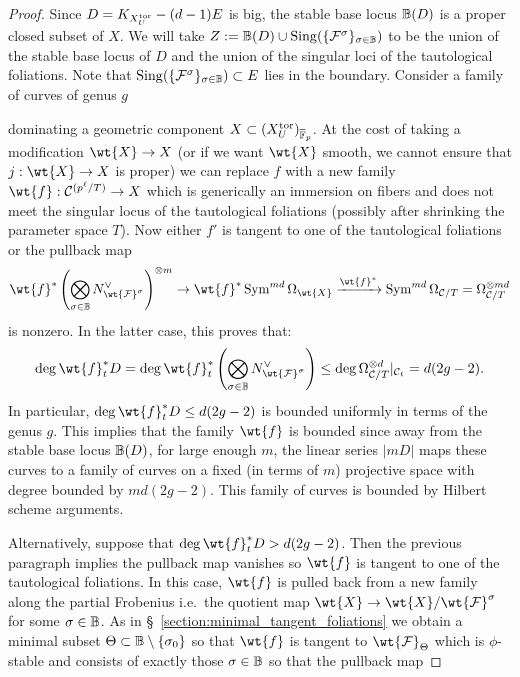 \documentclass[main.tex]{subfiles}
\begin{document}
{\begin{proof}
Since $D = K_{X_U^{\mathrm{tor}}} - (d-1) E$ is big, the stable base locus $\mathbb{B}(D)$ is a proper closed subset of $X$. We will take $Z := \mathbb{B}(D) \cup \operatorname{\mathrm{Sing}}(\{ \mathcal{F}^{\sigma} \}_{\sigma \in \mathbb{B}})$ to be the union of the stable base locus of $D$ and the union of the singular loci of the tautological foliations. Note that $\operatorname{\mathrm{Sing}}(\{ \mathcal{F}^{\sigma} \}_{\sigma \in \mathbb{B}}) \subset E$ lies in the boundary. 
Consider a family of curves of genus $g$
\begin{center}
\end{center}
dominating a geometric component $X \subset (X_U^{\mathrm{tor}})_{\overline{\mathbb{F}}_p}$. At the cost of taking a modification $\wt{X} \to X$ (or if we want $\wt{X}$ smooth, we cannot ensure that $j : \wt{X} \to X$ is proper) we can replace $f$ with a new family $\wt{f} : \cC^{(p^{\ell}/T)} \to X$ which is generically an immersion on fibers and does not meet the singular locus of the tautological foliations (possibly after shrinking the parameter space $T$). Now either $f'$ is tangent to one of the tautological foliations or the pullback map 
\[ \wt{f}^* \left( \bigotimes_{\sigma \in \BB} N^{\vee}_{\wt{\F}^{\sigma}} \right)^{\ot m} \to \wt{f}^* \Sym^{md} \Omega_{\wt{X}} \xrightarrow{\wt{f}^*} \Sym^{md} \Omega_{\cC/T} = \Omega_{\cC/T}^{\ot md} \]
is nonzero. In the latter case, this proves that:
\[ \deg{\wt{f}_t^* D} = \deg{\wt{f}_t^* \left( \bigotimes_{\sigma \in \BB} N^{\vee}_{\wt{\F}^{\sigma}} \right) } \le \deg{\Omega_{\cC/T}^{\ot d}|_{\cC_t}} = d(2 g - 2). \]
In particular, $\deg{\wt{f}_t^* D} \le d(2 g - 2)$ is bounded uniformly in terms of the genus $g$. This implies that the family $\wt{f}$ is bounded since away from the stable base locus $\mathbb{B}(D)$, for large enough $m$, the linear series $|mD|$ maps these curves to a family of curves on a fixed (in terms of $m$) projective space with degree bounded by $md(2g - 2)$. This family of curves is bounded by Hilbert scheme arguments.
\par 
Alternatively, suppose that $\deg{\wt{f}_t^* D} > d(2 g - 2)$. Then the previous paragraph implies the pullback map vanishes so $\wt{f}$ is tangent to one of the tautological foliations. In this case, $\wt{f}$ is pulled back from a new family along the partial Frobenius i.e.\ the quotient map $\wt{X} \to \wt{X} / \wt{\F}^{\sigma}$ for some $\sigma \in \mathbb{B}$. As in \S~\ref{section:minimal_tangent_foliations} we obtain a minimal subset $\Theta \subset \mathbb{B} \setminus \{ \sigma_0 \}$ so that $\wt{f}$ is tangent to $\wt{\F}_{\Theta}$ which is $\phi$-stable and consists of exactly those $\sigma \in \mathbb{B}$ so that the pullback map 

\end{proof}}
\end{document}
